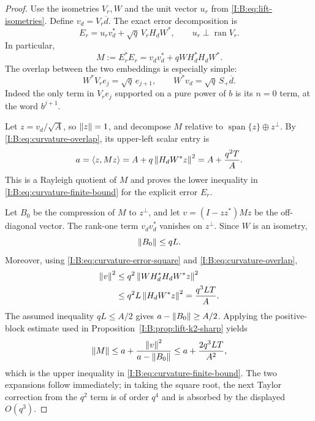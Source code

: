 \begin{proof}
Use the isometries $V_r,W$ and the unit vector $u_r$ from
\eqref{I:B:eq:lift-isometries}. Define $v_d=V_r\overline d$. The exact
error decomposition is
\[
 E_r=u_rv_d^*+\sqrt q\,V_rH_dW^*,
 \qquad u_r\perp\operatorname{ran}V_r.
\]
In particular,
\begin{equation}
 M:=E_r^*E_r=v_dv_d^*+qWH_d^*H_dW^*.
 \label{I:B:eq:curvature-error-square}
\end{equation}
The overlap between the two embeddings is especially simple:
\begin{equation}
 W^*V_re_j=\sqrt q\,e_{j+1},\qquad
 W^*v_d=\sqrt q\,S_+\overline d.
 \label{I:B:eq:curvature-overlap}
\end{equation}
Indeed the only term in $V_re_j$ supported on a pure power of $b$ is
its $n=0$ term, at the word $b^{j+1}$.

Let $z=v_d/\sqrt A$, so $\left\lVert z\right\rVert=1$, and decompose $M$ relative to
$\operatorname{span}\{z\}\oplus z^\perp$. By
\eqref{I:B:eq:curvature-overlap}, its upper-left scalar entry is
\begin{equation}
 a=\langle z,Mz\rangle
   =A+q\left\lVert H_dW^*z\right\rVert^2
   =A+\frac{q^2T}{A}.
 \label{I:B:eq:curvature-rayleigh}
\end{equation}
This is a Rayleigh quotient of $M$ and proves the lower inequality in
\eqref{I:B:eq:curvature-finite-bound} for the explicit error $E_r$.

Let $B_0$ be the compression of $M$ to $z^\perp$, and let
$v=(I-zz^*)Mz$ be the off-diagonal vector. The rank-one term
$v_dv_d^*$ vanishes on $z^\perp$. Since $W$ is an isometry,
\begin{equation}
 \left\lVert B_0\right\rVert\le qL.
 \label{I:B:eq:curvature-complement}
\end{equation}
Moreover, using \eqref{I:B:eq:curvature-error-square} and
\eqref{I:B:eq:curvature-overlap},
\begin{align}
 \left\lVert v\right\rVert^2
 &\le q^2\left\lVert WH_d^*H_dW^*z\right\rVert^2\\
 &\le q^2L\left\lVert H_dW^*z\right\rVert^2
  =\frac{q^3LT}{A}.
 \label{I:B:eq:curvature-offdiagonal}
\end{align}
The assumed inequality $qL\le A/2$ gives
$a-\left\lVert B_0\right\rVert\ge A/2$. Applying the positive-block estimate used in
Proposition~\ref{I:B:prop:lift-k2-sharp} yields
\[
 \left\lVert M\right\rVert\le a+\frac{\left\lVert v\right\rVert^2}{a-\left\lVert B_0\right\rVert}
 \le a+\frac{2q^3LT}{A^2},
\]
which is the upper inequality in
\eqref{I:B:eq:curvature-finite-bound}. The two expansions follow immediately;
in taking the square root, the next Taylor correction from the $q^2$
term is of order $q^4$ and is absorbed by the displayed $O(q^3)$.
\end{proof}
